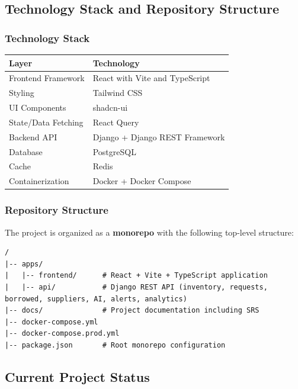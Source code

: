 \documentclass[12pt]{article}
\begin{document}
\subsection{Technology Stack and Repository Structure}

\subsubsection{Technology Stack}

\begin{center}
\begin{tabular}{|l|l|}
\hline
\textbf{Layer} & \textbf{Technology} \\
\hline
Frontend Framework & React with Vite and TypeScript \\
Styling & Tailwind CSS \\
UI Components & shadcn-ui \\
State/Data Fetching & React Query \\
Backend API & Django + Django REST Framework \\
Database & PostgreSQL \\
Cache & Redis \\
Containerization & Docker + Docker Compose \\
\hline
\end{tabular}
\end{center}

\subsubsection{Repository Structure}

The project is organized as a \textbf{monorepo} with the following top-level structure:

\begin{verbatim}
/
|-- apps/
|   |-- frontend/      # React + Vite + TypeScript application
|   |-- api/           # Django REST API (inventory, requests, borrowed, suppliers, AI, alerts, analytics)
|-- docs/              # Project documentation including SRS
|-- docker-compose.yml
|-- docker-compose.prod.yml
|-- package.json       # Root monorepo configuration
\end{verbatim}

\subsection{Current Project Status}
\end{document}
